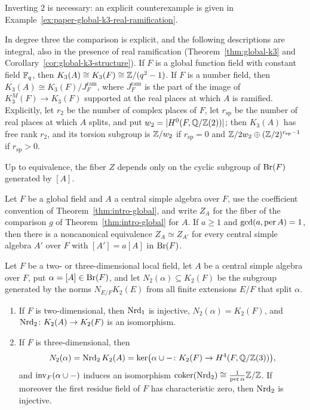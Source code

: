 Inverting $2$ is necessary: an explicit counterexample is given in Example~\ref{ex:paper-global-k3-real-ramification}.

In degree three the comparison is explicit, and the following descriptions are integral, also in the presence of real ramification (Theorem~\ref{thm:global-k3} and Corollary~\ref{cor:global-k3-structure}).
If $F$ is a global function field with constant field $\mathbb F_q$, then $K_3(A)\cong K_3(F)\cong\mathbb Z/(q^2-1)$.
If $F$ is a number field, then $K_3(A)\cong K_3(F)/J_F^{\mathrm{ram}}$, where $J_F^{\mathrm{ram}}$ is the part of the image of $K_3^M(F)\to K_3(F)$ supported at the real places at which $A$ is ramified.
Explicitly, let $r_2$ be the number of complex places of $F$, let $r_{\mathrm{sp}}$ be the number of real places at which $A$ splits, and put $w_2=|H^0(F,\mathbb Q/\mathbb Z(2))|$; then $K_3(A)$ has free rank $r_2$, and its torsion subgroup is $\mathbb Z/w_2$ if $r_{\mathrm{sp}}=0$ and $\mathbb Z/2w_2\oplus(\mathbb Z/2)^{r_{\mathrm{sp}}-1}$ if $r_{\mathrm{sp}}>0$.


Up to equivalence, the fiber $Z$ depends only on the cyclic subgroup of $\operatorname{Br}(F)$ generated by $[A]$.


\begin{introthm}\label{thm:intro-fiber}
Let $F$ be a global field and $A$ a central simple algebra over $F$, use the coefficient convention of Theorem~\ref{thm:intro-global}, and write $Z_A$ for the fiber of the comparison $g$ of Theorem~\ref{thm:intro-global} for $A$.
If $a\ge1$ and $\gcd(a,\operatorname{per} A)=1$, then there is a noncanonical equivalence $Z_A\simeq Z_{A'}$ for every central simple algebra $A'$ over $F$ with $[A']=a[A]$ in $\operatorname{Br}(F)$.
\end{introthm}

\begin{introthm}\label{thm:intro-higher}
Let $F$ be a two- or three-dimensional local field, let $A$ be a central simple algebra over $F$, put $\alpha=[A]\in\operatorname{Br}(F)$, and let $N_2(\alpha)\subseteq K_2(F)$ be the subgroup generated by the norms $N_{E/F}K_2(E)$ from all finite extensions $E/F$ that split $\alpha$.
\begin{enumerate}
\item If $F$ is two-dimensional, then $\operatorname{Nrd}_1$ is injective, $N_2(\alpha)=K_2(F)$, and $\operatorname{Nrd}_2\colon K_2(A)\to K_2(F)$ is an isomorphism.
\item If $F$ is three-dimensional, then
\[
 N_2(\alpha)=\operatorname{Nrd}_2K_2(A)=\ker\bigl(\alpha\cup-\colon K_2(F)\to H^4(F,\mathbb Q/\mathbb Z(3))\bigr),
\]
and $\operatorname{inv}_F(\alpha\cup-)$ induces an isomorphism $\operatorname{coker}(\operatorname{Nrd}_2)\cong\frac1{\operatorname{per}\alpha}\mathbb Z/\mathbb Z$.
If moreover the first residue field of $F$ has characteristic zero, then $\operatorname{Nrd}_2$ is injective.
\end{enumerate}
\end{introthm}

